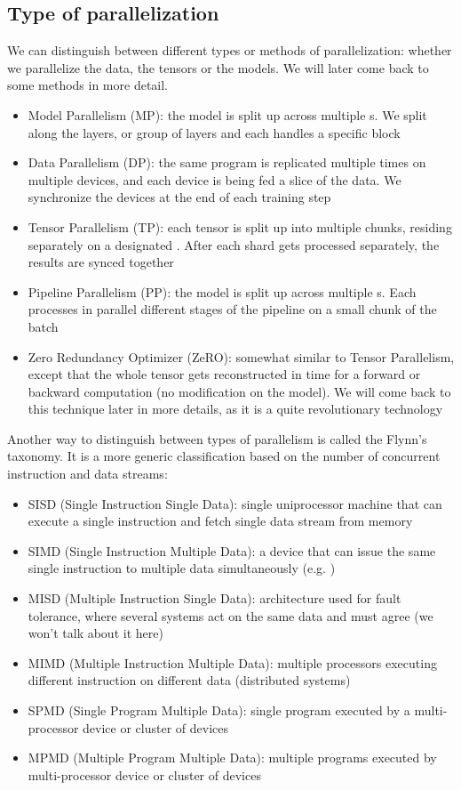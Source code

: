 \documentclass{article}
\begin{document}
\subsection{Type of parallelization}
We can distinguish between different types or methods of parallelization: whether we parallelize the data, the tensors or the models. We will later come back to some methods in more detail.
\begin{itemize}
  \item Model Parallelism (MP): the model is split up across multiple s. We split along the layers, or group of layers and each  handles a specific block
  \item Data Parallelism (DP): the same program is replicated multiple times on multiple devices, and each device is being fed a slice of the data. We synchronize the devices at the end of each training step
  \item Tensor Parallelism (TP): each tensor is split up into multiple chunks, residing separately on a designated . After each shard gets processed separately, the results are synced together
  \item Pipeline Parallelism (PP): the model is split up across multiple s. Each  processes in parallel different stages of the pipeline on a small chunk of the batch
  \item Zero Redundancy Optimizer (ZeRO): somewhat similar to Tensor Parallelism, except that the whole tensor gets reconstructed in time for a forward or backward computation (no modification on the model). We will come back to this technique later in more details, as it is a quite revolutionary technology
\end{itemize}

Another way to distinguish between types of parallelism is called the Flynn's taxonomy. It is a more generic classification based on the number of concurrent instruction and data streams:
\begin{itemize}
  \item SISD (Single Instruction Single Data): single uniprocessor machine that can execute a single instruction and fetch single data stream from memory
  \item SIMD (Single Instruction Multiple Data): a device that can issue the same single instruction to multiple data simultaneously (e.g. )
  \item MISD (Multiple Instruction Single Data): architecture used for fault tolerance, where several systems act on the same data and must agree (we won't talk about it here)
  \item MIMD (Multiple Instruction Multiple Data): multiple processors executing different instruction on different data (distributed systems)
  \item SPMD (Single Program Multiple Data): single program executed by a multi-processor device or cluster of devices
  \item MPMD (Multiple Program Multiple Data): multiple programs executed by multi-processor device or cluster of devices
\end{itemize}
\end{document}
